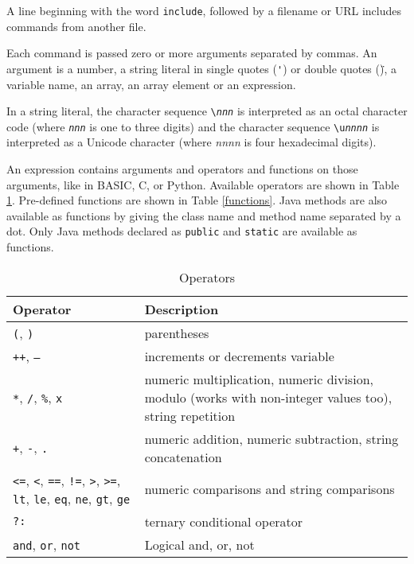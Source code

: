 A line beginning with the word \texttt{include}, followed by a filename
or URL includes commands from another file.

Each command is passed zero or more arguments separated by commas.
An argument is a number, a string literal in single quotes (\texttt{\'})
or double quotes (\texttt{\"}), a variable name, an array, an
array element or an expression.

In a string literal,
the character sequence \texttt{\textbackslash{}\textit{nnn}}
is interpreted as an octal character code (where
\texttt{\textit{nnn}} is one to three digits) and the character
sequence \texttt{\textbackslash{}u\textit{nnnn}} is interpreted
as a Unicode character (where \textit{nnnn} is four hexadecimal
digits).

An expression contains arguments and operators and functions
on those arguments, like in BASIC, C, or Python.
Available operators are shown in Table \ref{operators}.
Pre-defined functions are shown in Table \ref{functions}.
Java methods are also available as functions by giving the class name
and method name separated by a dot.  Only Java methods
declared as \texttt{public} and \texttt{static} are available
as functions.

\begin{table}[htb]
\begin{tabular}{|l|p{7cm}|}
\hline
Operator & Description \\
\hline
\hline

\texttt{(}, \texttt{)} & parentheses \\

\hline

\texttt{++}, \texttt{--} &
increments or decrements variable \\

\hline

\texttt{*}, \texttt{/}, \texttt{\%}, \texttt{x} &
numeric multiplication, numeric division, modulo (works
with non-integer values too), string repetition \\

\hline

\texttt{+}, \texttt{-}, \texttt{.} & numeric addition,
numeric subtraction, string concatenation \\

\hline

\texttt{<=}, \texttt{<}, \texttt{==},
\texttt{!=}, \texttt{>}, \texttt{>=},
\texttt{lt}, \texttt{le}, \texttt{eq},
\texttt{ne}, \texttt{gt}, \texttt{ge} &
numeric comparisons and string comparisons \\

\hline

\texttt{?:} & ternary conditional operator \\

\hline

\texttt{and},
\texttt{or},
\texttt{not} &
Logical and, or, not \\

\hline

\end{tabular}
\caption{Operators}
\label{operators}
\end{table}


